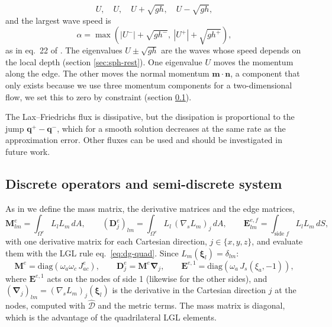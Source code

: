 \begin{equation*}
    U, \quad U, \quad U + \sqrt{gh}, \quad U - \sqrt{gh},
\end{equation*}
and the largest wave speed is
\begin{equation}
    \alpha = \max\left(|U^-| + \sqrt{gh^-},\ |U^+| + \sqrt{gh^+}\right),
\end{equation}
as in eq.~22 of \cite{bonev2018discontinuous}. The eigenvalues $U\pm\sqrt{gh}$ are the waves whose speed depends on the local depth (section \ref{sec:sph-rest}). One eigenvalue $U$ moves the momentum along the edge. The other moves the normal momentum $\mathbf{m}\cdot\mathbf{n}$, a component that only exists because we use three momentum components for a two-dimensional flow, we set this to zero by constraint (section \ref{sec:dg-operators}).

The Lax--Friedrichs flux is dissipative, but the dissipation is proportional to the jump $\mathbf{q}^+ - \mathbf{q}^-$, which for a smooth solution decreases at the same rate as the approximation error. Other fluxes can be used and should be investigated in future work.

\subsection{Discrete operators and semi-discrete system}\label{sec:dg-operators}
As in \cite{GIRALDO2002499} we define the mass matrix, the derivative matrices and the edge matrices,
\begin{equation*}
    \mathbf{M}^e_{lm} = \int_{\Omega^e}L_lL_m\,dA, \qquad
    (\mathbf{D}^e_j)_{lm} = \int_{\Omega^e}L_l\,(\nabla_s L_m)_j\,dA, \qquad
    \mathbf{E}^{e,f}_{lm} = \int_{\text{side } f}L_lL_m\,dS,
\end{equation*}
with one derivative matrix for each Cartesian direction, $j\in\{x,y,z\}$, and evaluate them with the LGL rule eq.~\eqref{eq:dg-quad}. Since $L_m(\boldsymbol{\xi}_l) = \delta_{lm}$:
\begin{equation}
    \mathbf{M}^e = \mathrm{diag}\left(\omega_a\omega_c\,J^e_{ac}\right), \qquad
    \mathbf{D}^e_j = \mathbf{M}^e\boldsymbol{\nabla}_j, \qquad
    \mathbf{E}^{e,1} = \mathrm{diag}\left(\omega_a\,J_s(\xi_a,-1)\right),
\end{equation}
where $\mathbf{E}^{e,1}$ acts on the nodes of side 1 (likewise for the other sides), and $(\boldsymbol{\nabla}_j)_{lm} = (\nabla_s L_m)_j(\boldsymbol{\xi}_l)$ is the derivative in the Cartesian direction $j$ at the nodes, computed with $\hat{\mathcal{D}}$ and the metric terms. The mass matrix is diagonal, which is the advantage of the quadrilateral LGL elements.

